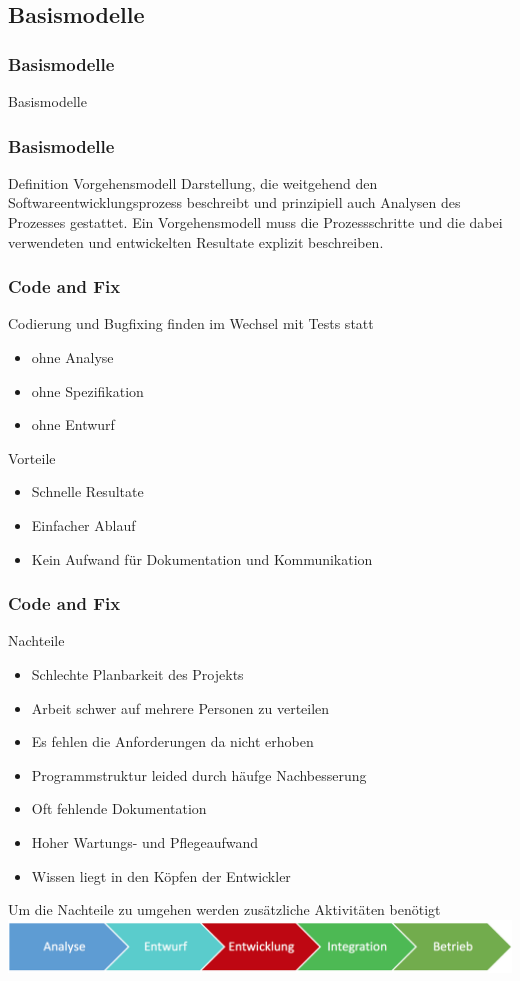 \subsection{Basismodelle}
\begin{frame}
\frametitle{Basismodelle}
\huge Basismodelle
\end{frame}

\begin{frame}
\frametitle{Basismodelle}
	\begin{block}{Definition Vorgehensmodell}
		Darstellung, die weitgehend den Softwareentwicklungsprozess beschreibt und prinzipiell 
		auch Analysen des Prozesses gestattet.
		Ein Vorgehensmodell muss die Prozessschritte und die dabei verwendeten und entwickelten 
		Resultate explizit beschreiben.
	\end{block}
\end{frame}

\begin{frame}
\frametitle{Code and Fix}
	Codierung und Bugfixing finden im Wechsel mit Tests statt
	\begin{itemize}
		\item ohne Analyse
		\item ohne Spezifikation
		\item ohne Entwurf
	\end{itemize}
	\bigskip
	Vorteile
	\begin{itemize}
		\item Schnelle Resultate
		\item Einfacher Ablauf
		\item Kein Aufwand für Dokumentation und Kommunikation
	\end{itemize}
\end{frame}

\begin{frame}
\frametitle{Code and Fix}
	Nachteile
	\begin{itemize}
		\item Schlechte Planbarkeit des Projekts
		\item Arbeit schwer auf mehrere Personen zu verteilen
		\item Es fehlen die Anforderungen da nicht erhoben
		\item Programmstruktur leided durch häufge Nachbesserung
		\item Oft fehlende Dokumentation
		\item Hoher Wartungs- und Pflegeaufwand
		\item Wissen liegt in den Köpfen der Entwickler
	\end{itemize}
	\bigskip
	Um die Nachteile zu umgehen werden zusätzliche Aktivitäten benötigt
	\center\includegraphics[width=1\textwidth,
		keepaspectratio=true]{bilder/se_phasen.png}
\end{frame}

